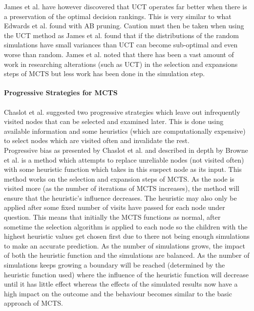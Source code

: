 \documentclass[journal]{IEEEtran}
\begin{document}
  James et al. \cite{wits} have however discovered that UCT operates far better when there is a preservation of the optimal decision rankings. This is very similar to what Edwards et al. \cite{AIM030} found with AB pruning. Caution must then be taken when using the UCT method as James et al. \cite{wits} found that if the distributions of the random simulations have small variances than UCT can become sub-optimal and even worse than random. James et al. \cite{wits} noted that there has been a vast amount of work in researching alterations (such as UCT) in the selection and expansions steps of MCTS but less work has been done in the simulation step. 
  \\\\
  \textbf{Progressive Strategies for MCTS}\\\\
  Chaslot et al. \cite{progressive} suggested two progressive strategies which leave out infrequently visited nodes that can be selected and examined later. This is done using available information and some heuristics (which are computationally expensive) to select nodes which are visited often and invalidate the rest.\\
  
  Progressive bias as presented by Chaslot et al. \cite{progressive} and described in depth by Browne et al. \cite{survey} is a method which attempts to replace unreliable nodes (not visited often) with some heuristic function which takes in this suspect node as its input. This method works on the selection and expansion steps of MCTS. As the node is visited more (as the number of iterations of MCTS increases), the method will ensure that the heuristic's influence decreases. The heuristic may also only be applied after some fixed number of visits have passed for each node under question. This means that initially the MCTS functions as normal, after sometime the selection algorithm is applied to each node so the children with the highest heuristic values get chosen first due to there not being enough simulations to make an accurate prediction. As the number of simulations grows, the impact of both the heuristic function and the simulations are balanced. As the number of simulations keeps growing a boundary will be reached (determined by
  the heuristic function used) where the influence of the heuristic function will decrease until it has little effect whereas the effects of the simulated results now have a high impact on the outcome and the behaviour becomes similar to the basic approach of MCTS. \\
  
\end{document}
